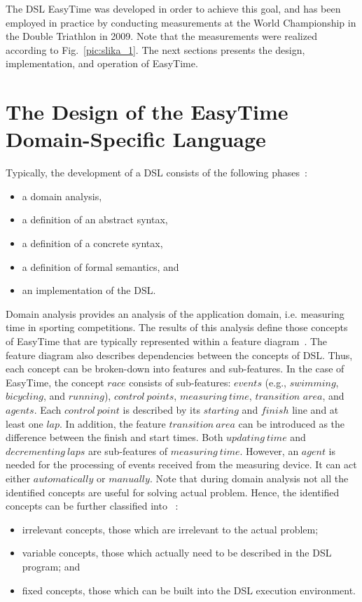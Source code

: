 \documentclass[preprint, prX]{revtex4}
\begin{document}
The DSL EasyTime was developed in order to achieve this goal, and has been employed in practice by conducting measurements at the World Championship in the Double Triathlon in 2009. Note that the measurements were realized according to Fig.~\ref{pic:slika_1}. The next sections presents the design, implementation, and operation of EasyTime.

\section{The Design of the EasyTime Domain-Specific Language}

Typically, the development of a DSL consists of the following phases~\cite{Mernik:2005}:
\begin{itemize}
  \item a domain analysis,
  \item a definition of an abstract syntax,
  \item a definition of a concrete syntax,
  \item a definition of formal semantics, and
  \item an implementation of the DSL.
\end{itemize}

Domain analysis provides an analysis of the application domain, i.e. measuring time in sporting competitions. The results of this
analysis define those concepts of EasyTime that are typically represented within a feature diagram~\cite{Deursen:2002,Stuikys:2009}. The feature diagram also describes dependencies between the concepts of DSL. Thus, each concept can be broken-down into features and sub-features. In the case of EasyTime, the concept $race$ consists of sub-features: $events$ (e.g., $swimming$, $bicycling$, and $running$), $control\ points$, $measuring\ time$, $transition$ $area$, and $agents$. Each $control\ point$ is described by its $starting$ and $finish$ line and at least one $lap$. In addition, the feature $transition\ area$ can be introduced as the difference between the finish and start times. Both $updating\ time$ and $decrementing\ laps$ are sub-features of $measuring\ time$. However, an $agent$ is needed for the processing of events received from the measuring device. It can act either $automatically$ or $manually$.
Note that during domain analysis not all the identified concepts are useful for solving actual problem. Hence, the identified concepts can be further classified into ~\cite{Mauw:2004}:

\begin{itemize}
  \item irrelevant concepts, those which are irrelevant to the actual problem;
  \item variable concepts, those which actually need to be described in the DSL program; and
  \item fixed concepts, those which can be built into the DSL execution environment.
\end{itemize}
\end{document}

